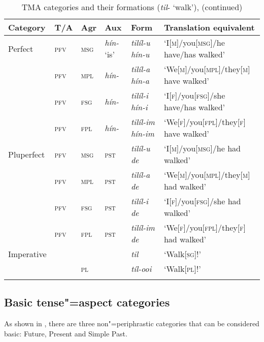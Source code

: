 \addtocounter{table}{-1}
\begin{sidewaystable}[p!]
\caption{TMA categories and their formations (\textit{til}- `walk'), (continued)}
\begin{tabularx}{\textwidth}{ l l l l l l }
\lsptoprule
Category &
T/A &
Agr &
Aux &
Form &
Translation equivalent\\\midrule
Perfect &
\textsc{pfv} &
\textsc{msg} &
\textit{hín-} `is' &
\textit{tilíl-u hín-u} &
`I[\textsc{m}]/you[\textsc{msg}]/he have/has walked' \\
&
\textsc{pfv} &
\textsc{mpl} &
\textit{hín-} &
\textit{tilíl-a hín-a} &
`We[\textsc{m}]/you[\textsc{mpl}]/they[\textsc{m}] have walked' \\
&
\textsc{pfv} &
\textsc{fsg} &
\textit{hín-} &
\textit{tilíl-i hín-i} &
`I[\textsc{f}]/you[\textsc{fsg}]/she have/has walked' \\
&
\textsc{pfv} &
\textsc{fpl} &
\textit{hín-} &
\textit{tilíl-im hín-im} &
`We[\textsc{f}]/you[\textsc{fpl}]/they[\textsc{f}] have walked' \\
Pluperfect &
\textsc{pfv} &
\textsc{msg} &
\textsc{pst} &
\textit{tilíl-u de} &
`I[\textsc{m}]/you[\textsc{msg}]/he had walked' \\
&
\textsc{pfv} &
\textsc{mpl} &
\textsc{pst} &
\textit{tilíl-a de} &
`We[\textsc{m}]/you[\textsc{mpl}]/they[\textsc{m}] had walked' \\
&
\textsc{pfv} &
\textsc{fsg} &
\textsc{pst} &
\textit{tilíl-i de} &
`I[\textsc{f}]/you[\textsc{fsg}]/she had walked' \\
&
\textsc{pfv} &
\textsc{fpl} &
\textsc{pst} &
\textit{tilíl-im de} &
`We[\textsc{f}]/you[\textsc{fpl}]/they[\textsc{f}] had walked' \\
Imperative &
&
&
&
\textit{til} &
`Walk[\textsc{sg}]!' \\
&
&
\textsc{pl} &
&
\textit{tíl-ooi} &
`Walk[\textsc{pl}]!' 
\\\lspbottomrule
\end{tabularx}
\label{tab:9-1b}
\end{sidewaystable}


\subsection{Basic tense"=aspect categories}
\label{subsec:9-1-1}


As shown in , there are three non"=periphrastic categories that can be considered basic: Future, Present and Simple Past.

